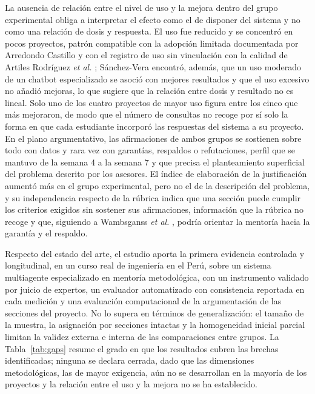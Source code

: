 \documentclass[journal]{IEEEtran}
\begin{document}
La ausencia de relación entre el nivel de uso y la mejora dentro del grupo experimental obliga a interpretar el efecto como el de disponer del sistema y no como una relación de dosis y respuesta. El uso fue reducido y se concentró en pocos proyectos, patrón compatible con la adopción limitada documentada por Arredondo Castillo \cite{arredondo2020} y con el registro de uso sin vinculación con la calidad de Artiles Rodríguez \emph{et al.} \cite{artiles2021}; Sánchez-Vera \cite{sanchezvera2025} encontró, además, que un uso moderado de un chatbot especializado se asoció con mejores resultados y que el uso excesivo no añadió mejoras, lo que sugiere que la relación entre dosis y resultado no es lineal. Solo uno de los cuatro proyectos de mayor uso figura entre los cinco que más mejoraron, de modo que el número de consultas no recoge por sí solo la forma en que cada estudiante incorporó las respuestas del sistema a su proyecto. En el plano argumentativo, las afirmaciones de ambos grupos se sostienen sobre todo con datos y rara vez con garantías, respaldos o refutaciones, perfil que se mantuvo de la semana 4 a la semana 7 y que precisa el planteamiento superficial del problema descrito por los asesores. El índice de elaboración de la justificación aumentó más en el grupo experimental, pero no el de la descripción del problema, y su independencia respecto de la rúbrica indica que una sección puede cumplir los criterios exigidos sin sostener sus afirmaciones, información que la rúbrica no recoge y que, siguiendo a Wambsganss \emph{et al.} \cite{wambsganss2020}, podría orientar la mentoría hacia la garantía y el respaldo.

Respecto del estado del arte, el estudio aporta la primera evidencia controlada y longitudinal, en un curso real de ingeniería en el Perú, sobre un sistema multiagente especializado en mentoría metodológica, con un instrumento validado por juicio de expertos, un evaluador automatizado con consistencia reportada en cada medición y una evaluación computacional de la argumentación de las secciones del proyecto. No lo supera en términos de generalización: el tamaño de la muestra, la asignación por secciones intactas y la homogeneidad inicial parcial limitan la validez externa e interna de las comparaciones entre grupos. La Tabla~\ref{tab:gaps} resume el grado en que los resultados cubren las brechas identificadas; ninguna se declara cerrada, dado que las dimensiones metodológicas, las de mayor exigencia, aún no se desarrollan en la mayoría de los proyectos y la relación entre el uso y la mejora no se ha establecido.
\end{document}
